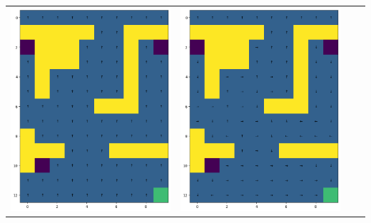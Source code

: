 \documentclass[12pt,a4paper]{report}
\begin{document}
\begin{landscape}
\begin{center}
\begin{tabular}{c || c  c  c}
            \includegraphics[width=0.35\textheight]{assets/dp/analysis/prob_0.25_gamma_0.2_policy.png}
        & 
            \includegraphics[width=0.35\textheight]{assets/dp/analysis/prob_0.5_gamma_0.2_policy.png}

\end{tabular}
\end{center}
\end{landscape}
\end{document}
